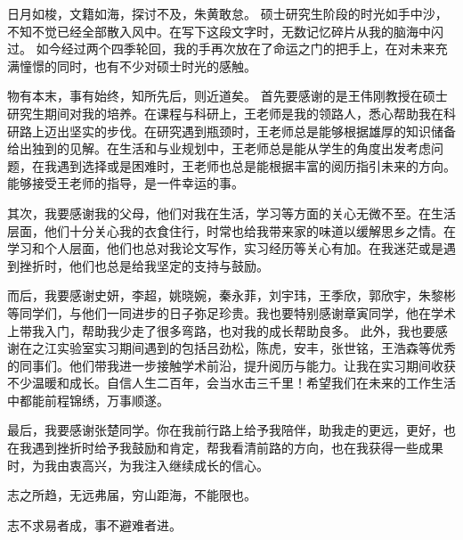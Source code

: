 \cleardoublepage
{}

日月如梭，文籍如海，探讨不及，朱黄敢怠。
硕士研究生阶段的时光如手中沙，不知不觉已经全部散入风中。在写下这段文字时，无数记忆碎片从我的脑海中闪过。
如今经过两个四季轮回，我的手再次放在了命运之门的把手上，在对未来充满憧憬的同时，也有不少对硕士时光的感触。

物有本末，事有始终，知所先后，则近道矣。
首先要感谢的是王伟刚教授在硕士研究生期间对我的培养。在课程与科研上，王老师是我的领路人，悉心帮助我在科研路上迈出坚实的步伐。在研究遇到瓶颈时，王老师总是能够根据雄厚的知识储备给出独到的见解。在生活和与业规划中，王老师总是能从学生的角度出发考虑问题，在我遇到选择或是困难时，王老师也总是能根据丰富的阅历指引未来的方向。能够接受王老师的指导，是一件幸运的事。

其次，我要感谢我的父母，他们对我在生活，学习等方面的关心无微不至。在生活层面，他们十分关心我的衣食住行，时常也给我带来家的味道以缓解思乡之情。在学习和个人层面，他们也总对我论文写作，实习经历等关心有加。在我迷茫或是遇到挫折时，他们也总是给我坚定的支持与鼓励。

而后，我要感谢史妍，李超，姚晓婉，秦永菲，刘宇玮，王季欣，郭欣宇，朱黎彬等同学们，与他们一同进步的日子弥足珍贵。我也要特别感谢章寅同学，他在学术上带我入门，帮助我少走了很多弯路，也对我的成长帮助良多。
此外，我也要感谢在之江实验室实习期间遇到的包括吕劲松，陈虎，安丰，张世铭，王浩森等优秀的同事们。他们带我进一步接触学术前沿，提升阅历与能力。让我在实习期间收获不少温暖和成长。自信人生二百年，会当水击三千里！希望我们在未来的工作生活中都能前程锦绣，万事顺遂。

最后，我要感谢张楚同学。你在我前行路上给予我陪伴，助我走的更远，更好，也在我遇到挫折时给予我鼓励和肯定，帮我看清前路的方向，也在我获得一些成果时，为我由衷高兴，为我注入继续成长的信心。

志之所趋，无远弗届，穷山距海，不能限也。

志不求易者成，事不避难者进。

\newpage